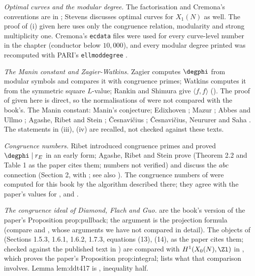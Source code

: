 \emph{Optimal curves and the modular degree.} The factorisation  and Cremona's conventions are in \cite[Chapter II]{Cremona97}; Stevens \cite{Stevens89} discusses optimal curves
for $X_1(N)$ as well. The proof of (i) given here uses only the congruence relation, modularity and strong multiplicity one. Cremona's \texttt{ecdata} files \cite{ecdata} were
used for every curve-level number in the chapter (conductor below $10{,}000$), and every modular degree printed was recomputed with PARI's \texttt{ellmoddegree} \cite{PARI}.

\emph{The Manin constant and Zagier-Watkins.} Zagier \cite{Zagier85} computes $\degphi$ from modular symbols and compares it with congruence primes; Watkins \cite{Watkins02} computes it from the symmetric
square $L$-value; Rankin and Shimura \cite{Rankin39,Shimura76} give $\langle f,f\rangle$ (). The proof of  given here is direct, so the normalisations of
\cite{Zagier85,Watkins02} were not compared with the book's. The Manin constant: Manin's conjecture; Edixhoven \cite{Edixhoven91}; Mazur \cite{Mazur78}; Abbes and Ullmo \cite{AU96}; Agashe, Ribet and Stein
\cite{ARS06}; \v Cesnavi\v cius \cite{Cesnavicius18}; \v Cesnavi\v cius, Neururer and Saha \cite{CNS}. The statements in (iii), (iv) are recalled, not checked against these
texts.

\emph{Congruence numbers.} Ribet \cite{Ribet83} introduced congruence primes and proved $\degphi\mid r_E$ in an early form; Agashe, Ribet and Stein \cite{ARS12} prove  (Theorem 2.2 and
Table 1 as the paper cites them; numbers not verified) and discuss the $abc$ connection (Section 2, with \cite{Frey,MaiMurty}; see also \cite{Murty99}). The congruence numbers of
 were computed for this book by the algorithm described there; they agree with the paper's values for ,  and .

\emph{The congruence ideal of Diamond, Flach and Guo.}  are the book's version of the paper's Proposition prop:pullback; the
argument is the projection formula (compare \cite{Zagier85} and \cite{ARS12}, whose arguments we have not compared in detail). The objects of \cite{DFG04} (Sections 1.5.3, 1.6.1, 1.6.2, 1.7.3, equations (13), (14), as the paper cites them; checked against the published text in ) are
compared with $H^1(X_0(N),\Zl)$ in , which proves the paper's Proposition prop:integral;  lists what that comparison involves. Lemma lem:ddt417 is \cite[Lemma 4.17]{DDT}, inequality half.

